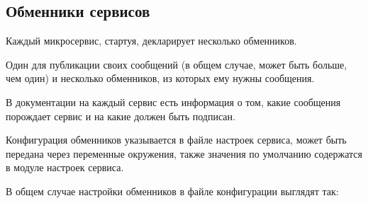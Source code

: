 \documentclass[a4paper,10pt,russian]{sphinxmanual}
\begin{document}
\subsection{Обменники сервисов}
\label{\detokenize{architecture:id18}}
\sphinxAtStartPar
Каждый микросервис, стартуя, декларирует несколько обменников.

\sphinxAtStartPar
Один \sphinxhyphen{} для публикации своих сообщений (в общем случае, может быть больше, чем
один) и несколько обменников, из которых ему нужны сообщения.

\sphinxAtStartPar
В документации на каждый сервис есть информация о том, какие сообщения
порождает сервис и на какие должен быть подписан.

\sphinxAtStartPar
Конфигурация обменников указывается в файле настроек сервиса, может быть
передана через переменные окружения, также значения по умолчанию
содержатся в модуле настроек сервиса.

\sphinxAtStartPar
В общем случае настройки обменников в файле конфигурации выглядят так:

\begin{sphinxVerbatim}[commandchars=\\\{\}]
\end{sphinxVerbatim}
\end{document}

